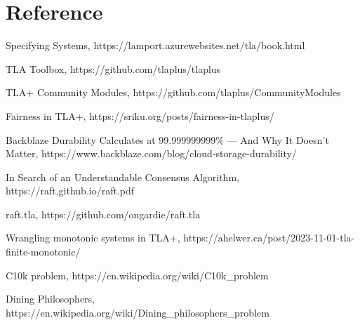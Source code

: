 \chapter{Reference}

\begin{thebibliography}{9}

Specifying Systems, 
https://lamport.azurewebsites.net/tla/book.html

TLA Toolbox,
https://github.com/tlaplus/tlaplus

TLA+ Community Modules,
https://github.com/tlaplus/CommunityModules

\bibitem{}
Fairness in TLA+,
https://sriku.org/posts/fairness-in-tlaplus/

Backblaze Durability Calculates at 99.999999999\% — And Why It Doesn’t Matter,
https://www.backblaze.com/blog/cloud-storage-durability/

In Search of an Understandable Consensus Algorithm,
https://raft.github.io/raft.pdf

raft.tla,
https://github.com/ongardie/raft.tla

Wrangling monotonic systems in TLA+,
https://ahelwer.ca/post/2023-11-01-tla-finite-monotonic/

C10k problem,
https://en.wikipedia.org/wiki/C10k\_problem

Dining Philosophers,
https://en.wikipedia.org/wiki/Dining\_philosophers\_problem

\end{thebibliography}

